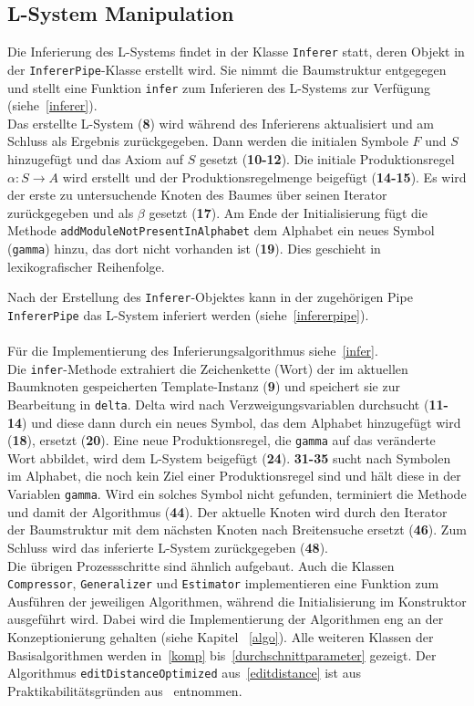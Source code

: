\subsection*{L-System Manipulation}
Die Inferierung des L-Systems findet in der Klasse \texttt{Inferer} statt, deren Objekt in der \texttt{InfererPipe}-Klasse erstellt wird.
Sie nimmt die Baumstruktur entgegegen und stellt eine Funktion \texttt{infer} zum Inferieren des L-Systems zur Verfügung (siehe~\ref{inferer}).\\
Das erstellte L-System (\textbf{8}) wird während des Inferierens aktualisiert und am Schluss als Ergebnis zurückgegeben.
Dann werden die initialen Symbole $F$ und $S$ hinzugefügt und das Axiom auf $S$ gesetzt (\textbf{10-12}).
Die initiale Produktionsregel $\alpha: S \rightarrow A$ wird erstellt und der Produktionsregelmenge beigefügt (\textbf{14-15}).
Es wird der erste zu untersuchende Knoten des Baumes über seinen Iterator zurückgegeben und als $\beta$ gesetzt (\textbf{17}).
Am Ende der Initialisierung fügt die Methode \texttt{addModuleNotPresentInAlphabet} dem Alphabet ein neues Symbol (\texttt{gamma}) hinzu,
das dort nicht vorhanden ist (\textbf{19}).
Dies geschieht in lexikografischer Reihenfolge.

Nach der Erstellung des \texttt{Inferer}-Objektes kann in der zugehörigen Pipe \mbox{\texttt{InfererPipe}} das L-System inferiert
werden (siehe~\ref{infererpipe}).\\~\\
Für die Implementierung des Inferierungsalgorithmus siehe~\ref{infer}.\\
Die \texttt{infer}-Methode extrahiert die Zeichenkette (Wort) der im aktuellen Baumknoten gespeicherten Template-Instanz
(\textbf{9}) und speichert sie zur Bearbeitung in \texttt{delta}.
Delta wird nach Verzweigungsvariablen durchsucht (\textbf{11-14}) und diese dann durch ein neues Symbol,
das dem Alphabet hinzugefügt wird (\textbf{18}), ersetzt (\textbf{20}).
Eine neue Produktionsregel, die \texttt{gamma} auf das veränderte Wort abbildet, wird dem L-System beigefügt (\textbf{24}).
\textbf{31-35} sucht nach Symbolen im Alphabet, die noch kein Ziel einer Produktionsregel sind und hält diese in der
Variablen \texttt{gamma}.
Wird ein solches Symbol nicht gefunden, terminiert die Methode und damit der Algorithmus (\textbf{44}).
Der aktuelle Knoten wird durch den Iterator der Baumstruktur mit dem nächsten Knoten nach Breitensuche ersetzt (\textbf{46}).
Zum Schluss wird das inferierte L-System zurückgegeben (\textbf{48}).\\

Die übrigen Prozessschritte sind ähnlich aufgebaut.
Auch die Klassen \texttt{Compressor}, \texttt{Generalizer} und \texttt{Estimator} implementieren eine Funktion zum Ausführen
der jeweiligen Algorithmen, während die Initialisierung im Konstruktor ausgeführt wird.
Dabei wird die Implementierung der Algorithmen eng an der Konzeptionierung gehalten (siehe Kapitel ~\ref{algo}).
Alle weiteren Klassen der Basisalgorithmen werden in~\ref{komp} bis~\ref{durchschnittparameter} gezeigt.
Der Algorithmus \texttt{editDistanceOptimized} aus~\ref{editdistance} ist aus Praktikabilitätsgründen aus~\cite{editdistance}
entnommen.